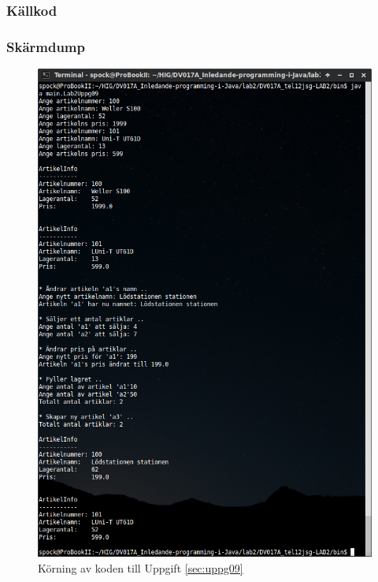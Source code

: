 \subsubsection{Källkod}
\label{src:uppg09}


\subsubsection{Skärmdump}
\begin{figure}[htbp]
    \centering
        \includegraphics[width=\linewidth]{img/09.png}
    \caption{Körning av koden till Uppgift \ref{sec:uppg09}}
    \label{fig:uppg09-screenshot}
\end{figure}

